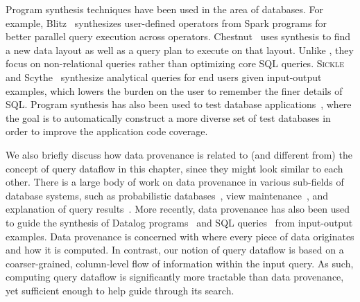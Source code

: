 Program synthesis techniques 
have been used in the area of databases. 
For example, 
Blitz~\cite{synthesis-spark,blitz2} synthesizes user-defined operators from Spark programs for better parallel query execution across operators.
Chestnut~\cite{chestnut} uses synthesis to find a new data layout as well as a query plan to execute on that layout. Unlike \slabcity, they focus on non-relational queries rather than optimizing core SQL queries.
\textsc{Sickle}~\cite{zhou2022synthesizing} and Scythe~\cite{wang2017synthesizing} synthesize analytical queries for end users given input-output examples, which lowers the burden on the user to remember the finer details of SQL.
Program synthesis has also been used to test database applications~\cite{qex,tesma,syndb,xie:symbolic2}, where the goal is to automatically construct a more diverse set of test databases in order to improve the application code coverage.


We also briefly discuss how data provenance is related to (and different from) the concept of query dataflow in this chapter, since they might look similar to each other. 
There is a large body of work on data provenance in various sub-fields of database systems, such as probabilistic databases~\cite{green2006models,suciu2011probabilistic}, view maintenance~\cite{buneman2002propagation}, and explanation of query results~\cite{green2007provenance,chapman2009not}. More recently, data provenance has also been used to guide the synthesis of Datalog programs~\cite{raghothaman2020provenance} and SQL queries~\cite{zhou2022synthesizing} from input-output examples. 
Data provenance is concerned with where every piece of data originates and how it is computed. 
In contrast, our notion of query dataflow is based on a coarser-grained, column-level flow of information within the input query.
As such, computing query dataflow is significantly more tractable than data provenance, yet sufficient enough to help guide \slabcity through its search.
